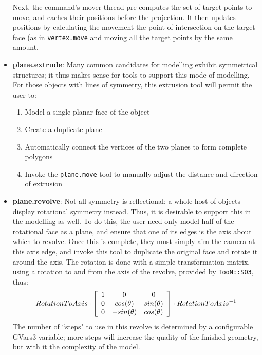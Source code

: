 \documentclass[a4paper,10pt]{article}
\begin{document}
\begin{itemize}
{Next, the command's mover thread pre-computes the set of target points to move, and caches their positions before the projection. It then updates positions by calculating the movement the point of intersection on the target face (as in \texttt{vertex.move} and moving all the target points by the same amount.}

\item{\textbf{plane.extrude}: Many common candidates for modelling exhibit symmetrical structures; it thus makes sense for tools to support this mode of modelling. For those objects with lines of symmetry, this extrusion tool will permit the user to:

\begin{enumerate}
 \item{Model a single planar face of the object}
 \item{Create a duplicate plane}
 \item{Automatically connect the vertices of the two planes to form complete polygons}
 \item{Invoke the \texttt{plane.move} tool to manually adjust the distance and direction of extrusion}
\end{enumerate}
}

\item{\textbf{plane.revolve}: Not all symmetry is reflectional; a whole host of objects display rotational symmetry instead. Thus, it is desirable to support this in the modelling as well. To do this, the user need only model half of the rotational face as a plane, and ensure that one of its edges is the axis about which to revolve. Once this is complete, they must simply aim the camera at this axis edge, and invoke this tool to duplicate the original face and rotate it around the axis. The rotation is done with a simple transformation matrix, using a rotation to and from the axis of the revolve, provided by \texttt{TooN::SO3}, thus:
\begin{eqnarray*}
 RotationToAxis \cdot  \left[ 
  \begin{array}{c c c}
    1 & 0 & 0 \\ 
    0 & cos( \theta ) & sin( \theta ) \\ 
    0 & -sin( \theta ) & cos( \theta ) 
  \end{array}\right] \cdot RotationToAxis^{-1}
\end{eqnarray*}
The number of ``steps" to use in this revolve is determined by a configurable GVars3 variable; more steps will increase the quality of the finished geometry, but with it the complexity of the model.}


\end{itemize}
\end{document}
